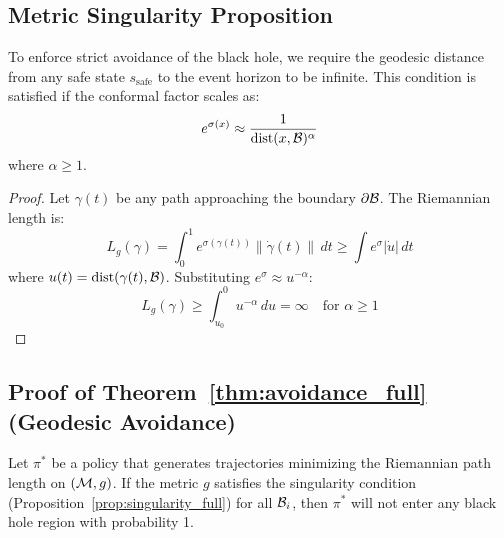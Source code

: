 \subsection{Metric Singularity Proposition}

\begin{proposition}
\label{prop:singularity_full}
To enforce strict avoidance of the black hole, we require the geodesic distance from any safe state $s_{\text{safe}}$ to the event horizon to be infinite. This condition is satisfied if the conformal factor scales as:
\begin{equation}
e^{\sigma(x)} \approx \frac{1}{\text{dist}(x, \mathcal{B})^\alpha}
\end{equation}
where $\alpha \ge 1$.
\end{proposition}

\begin{proof}
Let $\gamma(t)$ be any path approaching the boundary $\partial\mathcal{B}$. The Riemannian length is:
\begin{equation}
L_g(\gamma) = \int_0^1 e^{\sigma(\gamma(t))} \|\dot{\gamma}(t)\| \, dt \ge \int e^{\sigma} |\dot{u}| \, dt
\end{equation}
where $u(t) = \text{dist}(\gamma(t), \mathcal{B})$. Substituting $e^\sigma \approx u^{-\alpha}$:
\begin{equation}
L_g(\gamma) \ge \int_{u_0}^{0} u^{-\alpha} \, du = \infty \quad \text{for } \alpha \ge 1
\end{equation}
\end{proof}

\subsection{Proof of Theorem~\ref{thm:avoidance_full} (Geodesic Avoidance)}

\begin{theorem}
\label{thm:avoidance_full}
Let $\pi^*$ be a policy that generates trajectories minimizing the Riemannian path length on $(\mathcal{M}, g)$. If the metric $g$ satisfies the singularity condition (Proposition~\ref{prop:singularity_full}) for all $\mathcal{B}_i$, then $\pi^*$ will not enter any black hole region with probability 1.
\end{theorem}

